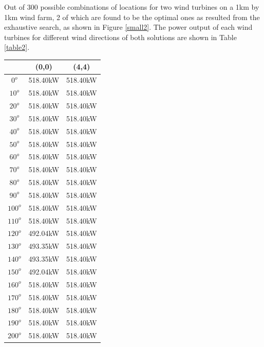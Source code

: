         Out of 300 possible combinations of locations for two wind turbines on a 1km by 1km wind farm, 2 of which are found to be the optimal ones as resulted from the exhaustive search, as shown in Figure \ref{small2}. The power output of each wind turbines for different wind directions of both solutions are shown in Table \ref{table2}.
        
        \singlespacing
        \begin{table}[H] %
            \centering
            \begin{tabular}{|c|c|c|} \hline
                 & (0,0) & (4,4) \\ \hline
                $0^o$ & 518.40kW & 518.40kW \\ \hline
                $10^o$ & 518.40kW & 518.40kW \\ \hline
                $20^o$ & 518.40kW & 518.40kW \\ \hline
                $30^o$ & 518.40kW & 518.40kW \\ \hline
                $40^o$ & 518.40kW & 518.40kW \\ \hline
                $50^o$ & 518.40kW & 518.40kW \\ \hline
                $60^o$ & 518.40kW & 518.40kW \\ \hline
                $70^o$ & 518.40kW & 518.40kW \\ \hline
                $80^o$ & 518.40kW & 518.40kW \\ \hline
                $90^o$ & 518.40kW & 518.40kW \\ \hline
                $100^o$ & 518.40kW & 518.40kW \\ \hline
                $110^o$ & 518.40kW & 518.40kW \\ \hline
                $120^o$ & 492.04kW & 518.40kW \\ \hline
                $130^o$ & 493.35kW & 518.40kW \\ \hline
                $140^o$ & 493.35kW & 518.40kW \\ \hline
                $150^o$ & 492.04kW & 518.40kW \\ \hline
                $160^o$ & 518.40kW & 518.40kW \\ \hline
                $170^o$ & 518.40kW & 518.40kW \\ \hline
                $180^o$ & 518.40kW & 518.40kW \\ \hline
                $190^o$ & 518.40kW & 518.40kW \\ \hline
                $200^o$ & 518.40kW & 518.40kW \\ \hline

\end{tabular}
\end{table}
